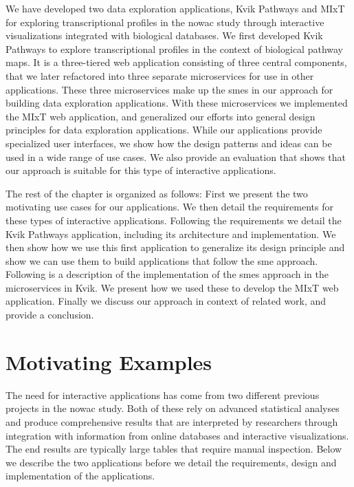 We have developed two data exploration applications, Kvik
Pathways\cite{fjukstad2015kvik} and
MIxT\cite{fjukstad2017building,dumeaux2017interactions} for exploring
transcriptional profiles in the \gls{nowac} study through interactive
visualizations integrated with biological databases. We first developed Kvik
Pathways to explore transcriptional profiles in the context of biological
pathway maps. It is a three-tiered web application consisting of three central
components, that we later refactored into three separate microservices for use
in other applications. These three microservices make up the \glspl{sme} in our
approach for building data exploration applications.  With these microservices
we implemented the MIxT web application, and generalized our efforts into
general design principles for data exploration applications. 
While our applications
provide specialized user interfaces, we show how the design patterns and ideas
can be used in a wide range of use cases. We also provide an evaluation that
shows that our approach is suitable for this type of interactive applications. 

The rest of the chapter is organized as follows: First we present the two
motivating use cases for our applications. We then detail the requirements for
these types of interactive applications. Following the requirements we detail
the Kvik Pathways application, including its architecture and implementation. We
then show how we use this first application to generalize its design principle
and show we can use them to build applications that follow the \gls{sme}
approach. Following is a description of the implementation of the \glspl{sme}
approach in the microservices in Kvik. We present how we used these to develop
the MIxT web application. Finally we discuss our approach in context of related
work, and provide a conclusion. 

\section{Motivating Examples}
The need for interactive applications has come from two different previous
projects in the \gls{nowac} study. Both of these rely on advanced statistical
analyses and produce comprehensive results that are interpreted by researchers
through integration with information from online databases and interactive
visualizations. The end results are typically large tables that require manual
inspection. Below we describe the two applications before we detail the
requirements, design and implementation of the applications. 

